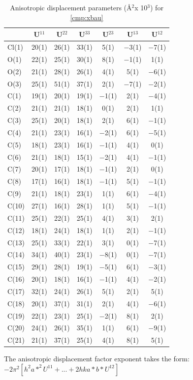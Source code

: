 \onecolumn
\begin{table}[h]
\centering
\caption{Anisotropic displacement parameters (\AA$^2$x 10$^3$) for \ref{cmp:xbau}} 
\footnotesize
\begin{tabular}{p{1in}cccccc} 
\toprule
& U$^{11}$ & U$^{22}$ & U$^{33}$ & U$^{23}$ & U$^{13}$ & U$^{12}$ \\
\midrule
Cl(1)&20(1) &26(1)&33(1) &5(1)&$-$3(1) &$-$7(1)\\
O(1)&22(1) &25(1)&30(1) &8(1)&$-$1(1) &1(1)\\
O(2)&21(1) &28(1)&26(1) &4(1)&5(1) &$-$6(1)\\
O(3)&25(1) &51(1)&37(1) &2(1)&$-$7(1) &$-$2(1)\\
C(1)&19(1) &20(1)&19(1) &$-$1(1)&2(1) &$-$4(1)\\
C(2)&21(1) &21(1)&18(1) &0(1)&2(1) &1(1)\\
C(3)&25(1) &20(1)&18(1) &2(1)&6(1) &$-$1(1)\\
C(4)&21(1) &23(1)&16(1) &$-$2(1)&6(1) &$-$5(1)\\
C(5)&18(1) &23(1)&16(1) &$-$1(1)&4(1) &0(1)\\
C(6)&21(1) &18(1)&15(1) &$-$2(1)&4(1) &$-$1(1)\\
C(7)&20(1) &17(1)&18(1) &$-$1(1)&2(1) &0(1)\\
C(8)&17(1) &16(1)&18(1) &$-$1(1)&5(1) &$-$1(1)\\
C(9)&21(1) &18(1)&23(1) &1(1)&6(1) &$-$4(1)\\
C(10)&27(1) &16(1)&28(1) &1(1)&5(1) &$-$1(1)\\
C(11)&25(1) &22(1)&25(1) &4(1)&3(1) &2(1)\\
C(12)&18(1) &24(1)&18(1) &1(1)&2(1) &$-$1(1)\\
C(13)&25(1) &33(1)&22(1) &3(1)&0(1) &$-$7(1)\\
C(14)&34(1) &40(1)&23(1) &$-$8(1)&0(1) &$-$7(1)\\
C(15)&29(1) &28(1)&19(1) &$-$5(1)&6(1) &$-$3(1)\\
C(16)&20(1) &18(1)&16(1) &$-$1(1)&4(1) &$-$2(1)\\
C(17)&32(1) &24(1)&26(1) &5(1)&2(1) &5(1)\\
C(18)&20(1) &37(1)&31(1) &2(1)&4(1) &$-$6(1)\\
C(19)&22(1) &23(1)&25(1) &$-$2(1)&8(1) &2(1)\\
C(20)&24(1) &26(1)&35(1) &1(1)&6(1) &$-$9(1)\\
C(21)&21(1) &37(1)&25(1) &4(1)&8(1) &5(1)\\
\bottomrule
\end{tabular}
\end{table}
{ \footnotesize
The anisotropic displacement factor exponent takes the form: 
$-2\pi^2\left[ h^2a*^2U^{11} + ... + 2 h k a* b* U^{12} \right]$ }
\pagebreak

